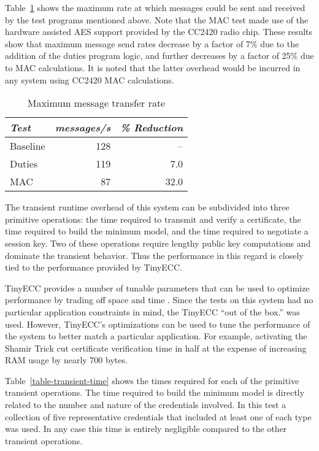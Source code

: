 Table~\ref{table-steady-state} shows the maximum rate at which messages could be sent and
received by the test programs mentioned above. Note that the MAC test made use of the hardware
assisted AES support provided by the CC2420 radio chip. These results show that maximum message
send rates decrease by a factor of 7\% due to the addition of the duties program logic, and
further decreases by a factor of 25\% due to MAC calculations. It is noted that the latter
overhead would be incurred in any system using CC2420 MAC calculations.

\begin{table}[!t]
  \newcommand\T{\rule{0pt}{2.1ex}}
  \centering
  \caption{Maximum message transfer rate}
  {
  \begin{tabular}{|l|r|r|} \hline
    \textit{Test} \T & \textit{messages/s} & \textit{\% Reduction} \\
    \hline \hline

    Baseline \T & 128 &   -- \\ \hline 
    Duties   \T & 119 &  7.0 \\ \hline
    MAC      \T &  87 & 32.0 \\ \hline
  \end{tabular}
  }
  \label{table-steady-state}
\end{table}

The transient runtime overhead of this system can be subdivided into three primitive operations:
the time required to transmit and verify a certificate, the time required to build the minimum
model, and the time required to negotiate a session key. Two of these operations require lengthy
public key computations and dominate the transient behavior. Thus the performance in this regard
is closely tied to the performance provided by TinyECC.

TinyECC provides a number of tunable parameters that can be used to optimize performance by
trading off space and time \cite{Liu-Peng-TinyECC-2008}. Since the tests on this system had no
particular application constraints in mind, the TinyECC ``out of the box.'' was used. However,
TinyECC's optimizations can be used to tune the performance of the system to better match a
particular application. For example, activating the Shamir Trick cut certificate verification
time in half at the expense of increasing RAM usage by nearly 700 bytes.

Table~\ref{table-transient-time} shows the times required for each of the primitive transient
operations. The time required to build the minimum model is directly related to the number and
nature of the credentials involved. In this test a collection of five representative credentials
that included at least one of each type was used. In any case this time is entirely negligible
compared to the other transient operations.

